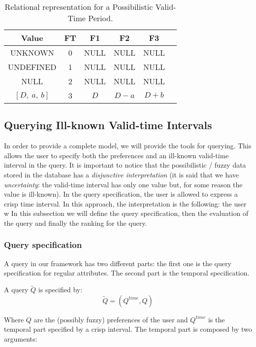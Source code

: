 \begin{table}
\caption{Relational representation for a Possibilistic Valid-Time Period.}
\centering
\begin{tabular}{c c c c c c}
\hline
Value & FT & F1 & F2 & F3  \\ \hline
UNKNOWN & 0 & NULL & NULL & NULL  \\ 
UNDEFINED & 1 & NULL & NULL & NULL  \\ 
NULL & 2 & NULL & NULL & NULL  \\ 
$\left[D,\ a,\ b \right]$ & 3 & $D$ & $D-a$ & $D+b$ \\ 
\hline
\end{tabular}
\label{table:relational-representation-pvp}
\end{table}

\subsection{Querying Ill-known Valid-time Intervals}
In order to provide a complete model, we will provide the tools for querying. This allows the user to specify both the preferences and an ill-known valid-time interval in the query. It is important to notice that the possibilistic / fuzzy data stored in the database has a \emph{disjunctive interpretation} (it is said that we have \emph{uncertainty}: the valid-time interval has only one value but, for some reason the value is ill-known). In the query specification, the user is allowed to express a crisp time interval. In this approach, the interpretation is the following: the user w
In this subsection we will define the query specification, then the evaluation of the query and finally the ranking for the query.

\subsubsection{Query specification}
A query in our framework has two different parts: the first one is the query specification for regular attributes. The second part is the temporal specification. 

\begin{definition}
A query $\tilde Q$ is specified by:
\begin{equation}
\label{eq:query-definition}
\tilde Q = \left( Q^{time}, Q \right)
\end{equation}
\end{definition}
Where $Q$ are the (possibly fuzzy) preferences of the user  and $Q^{time}$ is the temporal part specified by a crisp interval. The temporal part is composed by two arguments:

